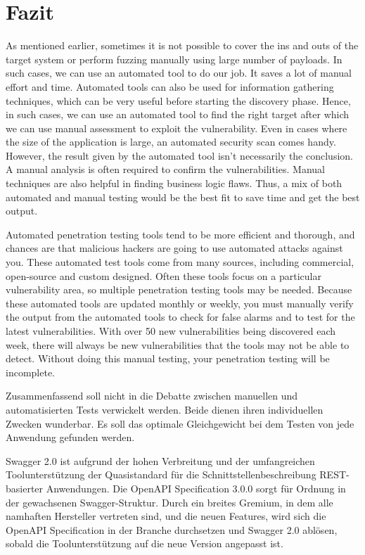 \chapter{Fazit}
\label{cha:k7}


As mentioned earlier, sometimes it is not possible to cover the ins and outs of the target system or perform fuzzing manually using large number of payloads. In such cases, we can use an automated tool to do our job. It saves a lot of manual effort and time.
Automated tools can also be used for information gathering techniques, which can be very useful before starting the discovery phase. Hence, in such cases, we can use an automated tool to find the right target after which we can use manual assessment to exploit the vulnerability. Even in cases where the size of the application is large, an automated security scan comes handy. However, the result given by the automated tool isn’t necessarily the conclusion. A manual analysis is often required to confirm the vulnerabilities. Manual techniques are also helpful in finding business logic flaws. Thus, a mix of both automated and manual testing would be the best fit to save time and get the best output.



Automated penetration testing tools tend to be more efficient and thorough, and chances are that malicious hackers are going to use automated attacks against you. These automated test tools come from many sources, including commercial, open-source and custom designed. Often these tools focus on a particular vulnerability area, so multiple penetration testing tools may be needed. Because these automated tools are updated monthly or weekly, you must manually verify the output from the automated tools to check for false alarms and to test for the latest vulnerabilities. With over 50 new vulnerabilities being discovered each week, there will always be new vulnerabilities that the tools may not be able to detect. Without doing this manual testing, your penetration testing will be incomplete. 

Zusammenfassend soll nicht in die Debatte zwischen manuellen und automatisierten Tests verwickelt werden. Beide dienen ihren individuellen Zwecken wunderbar. Es soll das optimale Gleichgewicht bei dem Testen von jede Anwendung gefunden werden.







Swagger 2.0 ist aufgrund der hohen Verbreitung und der umfangreichen Toolunterstützung der Quasistandard für die Schnittstellenbeschreibung REST-basierter Anwendungen. Die OpenAPI Specification 3.0.0 sorgt für Ordnung in der gewachsenen Swagger-Struktur. Durch ein breites Gremium, in dem alle namhaften Hersteller vertreten sind, und die neuen Features, wird sich die OpenAPI Specification in der Branche durchsetzen und Swagger 2.0 ablösen, sobald die Toolunterstützung auf die neue Version angepasst ist.

